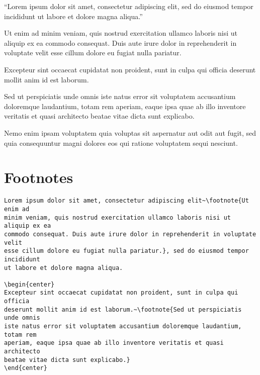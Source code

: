 ``Lorem ipsum dolor sit amet, consectetur adipiscing elit,
sed do eiusmod tempor incididunt ut labore et dolore magna aliqua.''

\begin{flushleft}
Ut enim ad minim veniam, quis nostrud exercitation ullamco laboris nisi ut
aliquip ex ea commodo consequat. Duis aute irure dolor in reprehenderit in
voluptate velit esse cillum dolore eu fugiat nulla pariatur.
\end{flushleft}

\begin{center}
Excepteur sint occaecat cupidatat non proident, sunt in culpa qui officia
deserunt mollit anim id est laborum.
\end{center}

\begin{flushright}
Sed ut perspiciatis unde omnis iste natus error sit voluptatem accusantium
doloremque laudantium, totam rem aperiam, eaque ipsa quae ab illo inventore
veritatis et quasi architecto beatae vitae dicta sunt explicabo.
\end{flushright}

Nemo enim ipsam voluptatem quia voluptas sit aspernatur aut odit aut fugit,
sed quia consequuntur magni dolores eos qui ratione voluptatem sequi nesciunt.

\section*{Footnotes}
\label{sec:footnotes}

\begin{lstlisting}[caption={Some footnotes.}]
Lorem ipsum dolor sit amet, consectetur adipiscing elit~\footnote{Ut enim ad
minim veniam, quis nostrud exercitation ullamco laboris nisi ut aliquip ex ea
commodo consequat. Duis aute irure dolor in reprehenderit in voluptate velit
esse cillum dolore eu fugiat nulla pariatur.}, sed do eiusmod tempor incididunt
ut labore et dolore magna aliqua.

\begin{center}
Excepteur sint occaecat cupidatat non proident, sunt in culpa qui officia
deserunt mollit anim id est laborum.~\footnote{Sed ut perspiciatis unde omnis
iste natus error sit voluptatem accusantium doloremque laudantium, totam rem
aperiam, eaque ipsa quae ab illo inventore veritatis et quasi architecto
beatae vitae dicta sunt explicabo.}
\end{center}
\end{lstlisting}

